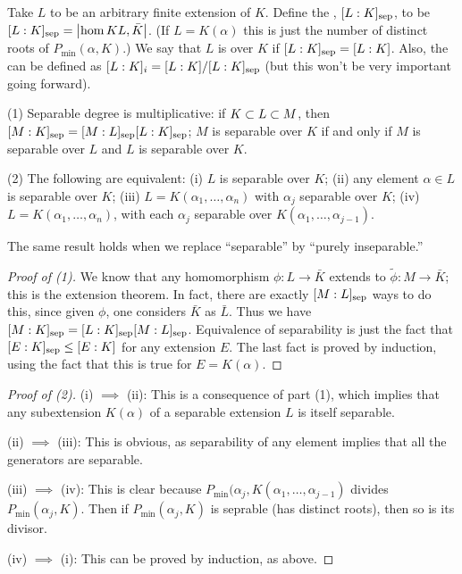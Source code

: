 \begin{dfn}
Take $L$ to be an arbitrary finite extension of $K$. 
Define the , $[L:K]_{\mathrm{sep}}$, to be $[L:K]_{\mathrm{sep}} = \left|\hom{K}{L, \bar{K}}\right|$.
(If $L = K(\alpha)$ this is just the number of distinct roots of $P_{\min}(\alpha, K)$.)
We say that $L$ is  over $K$ if $[L:K]_{\mathrm{sep}} = [L:K]$.
Also, the  can be defined as $[L:K]_i = [L:K]/[L:K]_{\mathrm{sep}}$ (but this won't be very important going forward).
\end{dfn}
\begin{thm}
(1) Separable degree is multiplicative: if $K \subset L \subset M$, then $[M:K]_{\mathrm{sep}} = [M:L]_{\mathrm{sep}}[L:K]_{\mathrm{sep}}$; $M$ is separable over $K$ if and only if $M$ is separable over $L$ and $L$ is separable over $K$.

(2) The following are equivalent: (i) $L$ is separable over $K$; (ii) any element $\alpha \in L$ is separable over $K$; (iii) $L = K(\alpha_1,\dotsc,\alpha_n)$ with $\alpha_j$ separable over $K$; (iv) $L = K(\alpha_1,\dotsc,\alpha_n)$, with each $\alpha_j$ separable over $K(\alpha_1,\dotsc,\alpha_{j-1})$.
\end{thm}
\begin{rmk}
The same result holds when we replace ``separable'' by ``purely inseparable.''
\end{rmk}
\begin{proof}[Proof of (1)]
We know that any homomorphism $\phi: L \to \bar{K}$ extends to $\tilde{\phi}: M \to \bar{K}$; this is the extension theorem.
In fact, there are exactly $[M:L]_{\mathrm{sep}}$ ways to do this, since given $\phi$, one considers $\bar{K}$ as $\bar{L}$.
Thus we have $[M:K]_{\mathrm{sep}} = [L:K]_{\mathrm{sep}} [M:L]_{\mathrm{sep}}$.
Equivalence of separability is just the fact that $[E:K]_{\mathrm{sep}} \leq [E:K]$ for any extension $E$.
The last fact is proved by induction, using the fact that this is true for $E = K(\alpha)$.
\end{proof}
\begin{proof}[Proof of (2)]
(i) $\implies$ (ii): This is a consequence of part (1), which implies that any subextension $K(\alpha)$ of a separable extension $L$ is itself separable.

(ii) $\implies$ (iii): This is obvious, as separability of any element implies that all the generators are separable.

(iii) $\implies$ (iv):  This is clear because $P_{\min}(\alpha_j, K(\alpha_1, \dotsc, \alpha_{j-1})$ divides $P_{\min}(\alpha_j, K)$.
Then if $P_{\min}(\alpha_j, K)$ is seprable (has distinct roots), then so is its divisor.

(iv) $\implies$ (i): This can be proved by induction, as above.
\end{proof}

